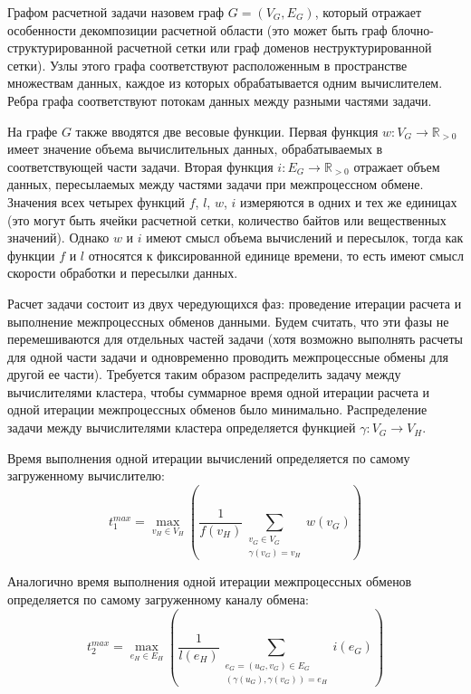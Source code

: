 \begin{definition}
Графом расчетной задачи\label{term:graph_task} назовем граф $G = (V_G, E_G)$, который отражает особенности декомпозиции расчетной области (это может быть граф блочно-структурированной расчетной сетки или граф доменов неструктурированной сетки).
Узлы этого графа соответствуют расположенным в пространстве множествам данных, каждое из которых обрабатывается одним вычислителем.
Ребра графа соответствуют потокам данных между разными частями задачи.
\end{definition}

На графе $G$ также вводятся две весовые функции.
Первая функция $w: V_G \rightarrow \mathbb{R}_{> 0}$ имеет значение объема вычислительных данных, обрабатываемых в соответствующей части задачи.
Вторая функция $i: E_G \rightarrow \mathbb{R}_{> 0}$ отражает объем данных, пересылаемых между частями задачи при межпроцессном обмене.
Значения всех четырех функций $f$, $l$, $w$, $i$ измеряются в одних и тех же единицах (это могут быть ячейки расчетной сетки, количество байтов или вещественных значений).
Однако $w$ и $i$ имеют смысл объема вычислений и пересылок, тогда как функции $f$ и $l$ относятся к фиксированной единице времени, то есть имеют смысл скорости обработки и пересылки данных.

Расчет задачи состоит из двух чередующихся фаз: проведение итерации расчета и выполнение межпроцессных обменов данными.
Будем считать, что эти фазы не перемешиваются для отдельных частей задачи (хотя возможно выполнять расчеты для одной части задачи и одновременно проводить межпроцессные обмены для другой ее части).
Требуется таким образом распределить задачу между вычислителями кластера, чтобы суммарное время одной итерации расчета и одной итерации межпроцессных обменов было минимально.
Распределение задачи между вычислителями кластера определяется функцией $\gamma: V_G \rightarrow V_H$.

Время выполнения одной итерации вычислений определяется по самому загруженному вычислителю:
\begin{equation}
	t_1^{max} = \max_{v_H \in V_H}{\left( \frac{1}{f(v_H)} \sum_{\substack{v_G \in V_G \\ \gamma(v_G) = v_H}}{w(v_G)} \right)}
\end{equation}

Аналогично время выполнения одной итерации межпроцессных обменов определяется по самому загруженному каналу обмена:
\begin{equation}
	t_2^{max} = \max_{e_H \in E_H}{\left( \frac{1}{l(e_H)} \sum_{\substack{e_G = (u_G, v_G) \in E_G \\ (\gamma(u_G), \gamma(v_G)) = e_H}}{i(e_G)} \right)}
\end{equation}

